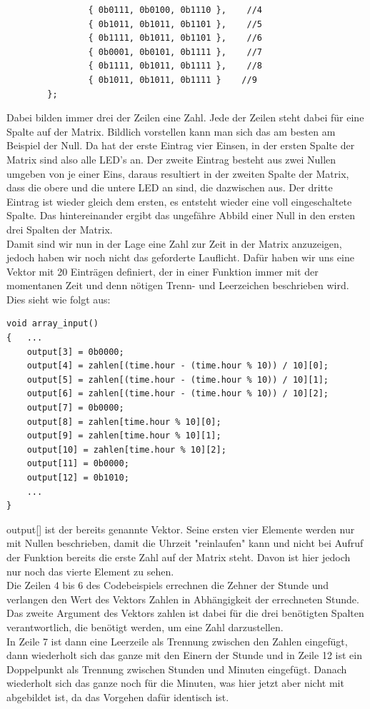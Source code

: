 \documentclass[openright,twoside,11pt,a4paper]{scrartcl}
\begin{document}
\begin{flushleft}
\begin{lstlisting}
			 	{ 0b0111, 0b0100, 0b1110 },    //4
			 	{ 0b1011, 0b1011, 0b1101 },    //5
			 	{ 0b1111, 0b1011, 0b1101 },    //6
			 	{ 0b0001, 0b0101, 0b1111 },    //7
			 	{ 0b1111, 0b1011, 0b1111 },    //8
			 	{ 0b1011, 0b1011, 0b1111 }    //9
	 	};
	 	\end{lstlisting}
	 	Dabei bilden immer drei der Zeilen eine Zahl. Jede der Zeilen steht dabei für eine Spalte auf der Matrix. Bildlich vorstellen kann man sich das am besten am Beispiel der Null. Da hat der erste Eintrag vier Einsen, in der ersten Spalte der Matrix sind also alle LED's an. Der zweite Eintrag besteht aus zwei Nullen umgeben von je einer Eins, daraus resultiert in der zweiten Spalte der Matrix, dass die obere und die untere LED an sind, die dazwischen aus. Der dritte Eintrag ist wieder gleich dem ersten, es entsteht wieder eine voll eingeschaltete Spalte. Das hintereinander ergibt das ungefähre Abbild einer Null in den ersten drei Spalten der Matrix. \\
	 	Damit sind wir nun in der Lage eine Zahl zur Zeit in der Matrix anzuzeigen, jedoch haben wir noch nicht das geforderte Lauflicht. Dafür haben wir uns eine Vektor mit 20 Einträgen definiert, der in einer Funktion immer mit der momentanen Zeit und denn nötigen Trenn- und Leerzeichen beschrieben wird. Dies sieht wie folgt aus:
	 	\begin{lstlisting}
void array_input()
{	...
	output[3] = 0b0000;
	output[4] = zahlen[(time.hour - (time.hour % 10)) / 10][0];
	output[5] = zahlen[(time.hour - (time.hour % 10)) / 10][1];
	output[6] = zahlen[(time.hour - (time.hour % 10)) / 10][2];
	output[7] = 0b0000;
	output[8] = zahlen[time.hour % 10][0];
	output[9] = zahlen[time.hour % 10][1];
	output[10] = zahlen[time.hour % 10][2];
	output[11] = 0b0000;
	output[12] = 0b1010;
	...
}
	 	\end{lstlisting}
	 	output[] ist der bereits genannte Vektor. Seine ersten vier Elemente werden nur mit Nullen beschrieben, damit die Uhrzeit "reinlaufen" kann und nicht bei Aufruf der Funktion bereits die erste Zahl auf der Matrix steht. Davon ist hier jedoch nur noch das vierte Element zu sehen. \\
	 	Die Zeilen 4 bis 6 des Codebeispiels errechnen die Zehner der Stunde und verlangen den Wert des Vektors Zahlen in Abhängigkeit der errechneten Stunde. Das zweite Argument des Vektors zahlen ist dabei für die drei benötigten Spalten verantwortlich, die benötigt werden, um eine Zahl darzustellen.\\
	 	In Zeile 7 ist dann eine Leerzeile als Trennung zwischen den Zahlen eingefügt, dann wiederholt sich das ganze mit den Einern der Stunde und in Zeile 12 ist ein Doppelpunkt als Trennung zwischen Stunden und Minuten eingefügt. Danach wiederholt sich das ganze noch für die Minuten, was hier jetzt aber nicht mit abgebildet ist, da das Vorgehen dafür identisch ist.\\

\end{flushleft}
\end{document}
